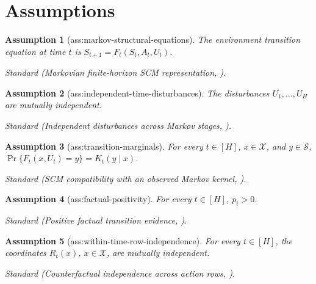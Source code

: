 \documentclass{article}
\newtheorem{assumption}{Assumption}
\begin{document}
\section{Assumptions}

\begin{assumption}[ass:markov-structural-equations]\label{ass:markov-structural-equations}
The environment transition equation at time \(t\) is \(S_{t+1}=F_t(S_t,A_t,U_t)\).
\par\smallskip\noindent\emph{Standard} (Markovian finite-horizon SCM representation, \cite{LallyKazemiPaoletti2026RobustCounterfactualMDP}).
\end{assumption}

\begin{assumption}[ass:independent-time-disturbances]\label{ass:independent-time-disturbances}
The disturbances \(U_1,\ldots,U_H\) are mutually independent.
\par\smallskip\noindent\emph{Standard} (Independent disturbances across Markov stages, \cite{LallyKazemiPaoletti2026RobustCounterfactualMDP}).
\end{assumption}

\begin{assumption}[ass:transition-marginals]\label{ass:transition-marginals}
For every \(t\in[H]\), \(x\in\mathcal X\), and \(y\in\mathcal S\), \(\Pr\{F_t(x,U_t)=y\}=K_t(y\mid x)\).
\par\smallskip\noindent\emph{Standard} (SCM compatibility with an observed Markov kernel, \cite{ZhangTianBareinboim2022PartialCounterfactual}).
\end{assumption}

\begin{assumption}[ass:factual-positivity]\label{ass:factual-positivity}
For every \(t\in[H]\), \(p_t>0\).
\par\smallskip\noindent\emph{Standard} (Positive factual transition evidence, \cite{LallyKazemiPaoletti2026RobustCounterfactualMDP}).
\end{assumption}

\begin{assumption}[ass:within-time-row-independence]\label{ass:within-time-row-independence}
For every \(t\in[H]\), the coordinates \(R_t(x)\), \(x\in\mathcal X\), are mutually independent.
\par\smallskip\noindent\emph{Standard} (Counterfactual independence across action rows, \cite{LiLeeBareinboim2026CounterfactualShapley}).
\end{assumption}
\end{document}
